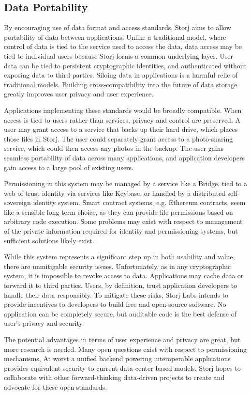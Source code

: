 \documentclass[a4paper,10pt]{article}
\begin{document}
\subsection{Data Portability}
By encouraging use of data format and access standards, Storj aims to allow portability of data between applications. Unlike a traditional model, where control of data is tied to the service used to access the data, data access may be tied to individual users because Storj forms a common underlying layer. User data can be tied to persistent cryptographic identities, and authenticated without exposing data to third parties. Siloing data in applications is a harmful relic of traditional models. Building cross-compatibility into the future of data storage greatly improves user privacy and user experience.

Applications implementing these standards would be broadly compatible. When access is tied to users rather than services, privacy and control are preserved. A user may grant access to a service that backs up their hard drive, which places those files in Storj. The user could separately grant access to a photo-sharing service, which could then access any photos in the backup. The user gains seamless portability of data across many applications, and application developers gain access to a large pool of existing users.

Permissioning in this system may be managed by a service like a Bridge, tied to a web of trust identity via services like Keybase, or handled by a distributed self-sovereign identity system. Smart contract systems, e.g. Ethereum \cite{17} contracts, seem like a sensible long-term choice, as they can provide file permissions based on arbitrary code execution. Some problems may exist with respect to management of the private information required for identity and permissioning systems, but sufficient solutions likely exist.

While this system represents a significant step up in both usability and value, there are unmitigable security issues. Unfortunately, as in any cryptographic system, it is impossible to revoke access to data. Applications may cache data or forward it to third parties. Users, by definition, trust application developers to handle their data responsibly. To mitigate these risks, Storj Labs intends to provide incentives to developers to build free and open-source software. No application can be completely secure, but auditable code is the best defense of user’s privacy and security.

The potential advantages in terms of user experience and privacy are great, but more research is needed. Many open questions exist with respect to permissioning mechanisms,  At worst a unified backend powering interoperable applications provides equivalent security to current data-center based models. Storj hopes to collaborate with other forward-thinking data-driven projects to create and advocate for these open standards.
\end{document}

